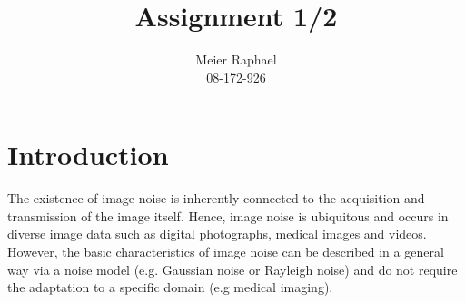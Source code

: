 \documentclass{paper}
\title{Assignment 1/2}
\author{Meier Raphael\\08-172-926}
\begin{document}
\maketitle

%



\section{Introduction}
The existence of image noise is inherently connected to the acquisition and transmission of the image itself. Hence, image noise is ubiquitous and occurs in diverse image data such as digital photographs, medical images and videos. However, the basic characteristics of image noise can be described in a general way via a noise model (e.g. Gaussian noise or Rayleigh noise) and do not require the adaptation to a specific domain (e.g medical imaging).
\end{document}
